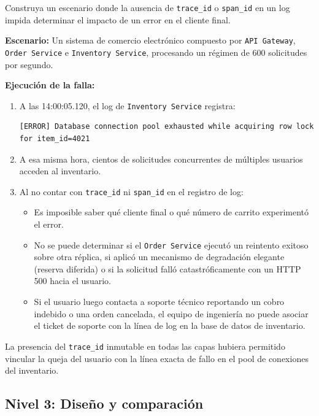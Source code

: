 \documentclass[variant=guia,cover=institutional,mode=screen]{ua-engineering-v6-article}
\begin{document}
\begin{uaexercise}
Construya un escenario donde la ausencia de \texttt{trace\_id} o \texttt{span\_id} en un log impida determinar el impacto de un error en el cliente final.
\end{uaexercise}
\begin{uaanswer}
\textbf{Escenario:} Un sistema de comercio electrónico compuesto por \texttt{API Gateway}, \texttt{Order Service} e \texttt{Inventory Service}, procesando un régimen de 600 solicitudes por segundo.

\textbf{Ejecución de la falla:}
\begin{enumerate}
\item A las 14:00:05.120, el log de \texttt{Inventory Service} registra:
\begin{verbatim}
[ERROR] Database connection pool exhausted while acquiring row lock for item_id=4021
\end{verbatim}
\item A esa misma hora, cientos de solicitudes concurrentes de múltiples usuarios acceden al inventario.
\item Al no contar con \texttt{trace\_id} ni \texttt{span\_id} en el registro de log:
\begin{itemize}
\item Es imposible saber qué cliente final o qué número de carrito experimentó el error.
\item No se puede determinar si el \texttt{Order Service} ejecutó un reintento exitoso sobre otra réplica, si aplicó un mecanismo de degradación elegante (reserva diferida) o si la solicitud falló catastróficamente con un HTTP 500 hacia el usuario.
\item Si el usuario luego contacta a soporte técnico reportando un cobro indebido o una orden cancelada, el equipo de ingeniería no puede asociar el ticket de soporte con la línea de log en la base de datos de inventario.
\end{itemize}
\end{enumerate}
La presencia del \texttt{trace\_id} inmutable en todas las capas hubiera permitido vincular la queja del usuario con la línea exacta de fallo en el pool de conexiones del inventario.
\end{uaanswer}


\subsection*{Nivel 3: Diseño y comparación}
\end{document}
